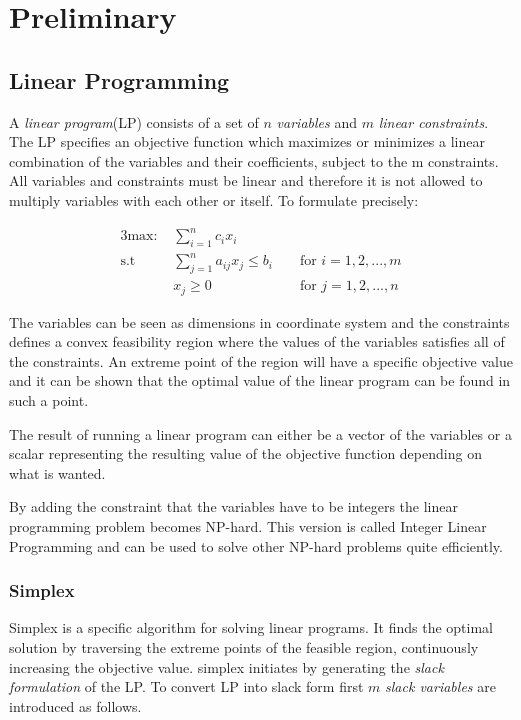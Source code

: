 \section{Preliminary}
\subsection{Linear Programming}
A \textit{linear program}(LP) consists of a set of $n$ \textit{variables} and $m$ \textit{linear constraints}. The LP specifies an objective function which maximizes or minimizes a linear combination of the variables and their coefficients, subject to the m constraints. All variables and constraints must be linear and therefore it is not allowed to multiply variables with each other or itself. To formulate precisely:

\begin{alignat}{3}
\text{max: } &\sum_{i=1}^{n} c_i x_i\nonumber\\
\text{s.t }  & \sum_{j=1}^{n} a_{ij} x_j \leq b_i && \text{ for } i=1,2,...,m\nonumber\\
& x_j \geq 0                         && \text{ for } j=1,2,...,n\nonumber
\end{alignat}

The variables can be seen as dimensions in coordinate system and the constraints defines a convex feasibility region where the values of the variables satisfies all of the constraints. An extreme point of the region will have a specific objective value and it can be shown that the optimal value of the linear program can be found in such a point.


The result of running a linear program can either be a vector of the variables or a scalar representing the resulting value of the objective function depending on what is wanted.

By adding the constraint that the variables have to be integers the linear programming problem becomes NP-hard. This version is called Integer Linear Programming and can be used to solve other NP-hard problems quite efficiently.

\subsubsection{Simplex}
Simplex is a specific algorithm for solving linear programs. It finds the optimal solution by traversing the extreme points of the feasible region, continuously increasing the objective value.
simplex initiates by generating the \textit{slack formulation} of the LP. To convert LP into slack form first $m$ \textit{slack variables} are introduced as follows.

